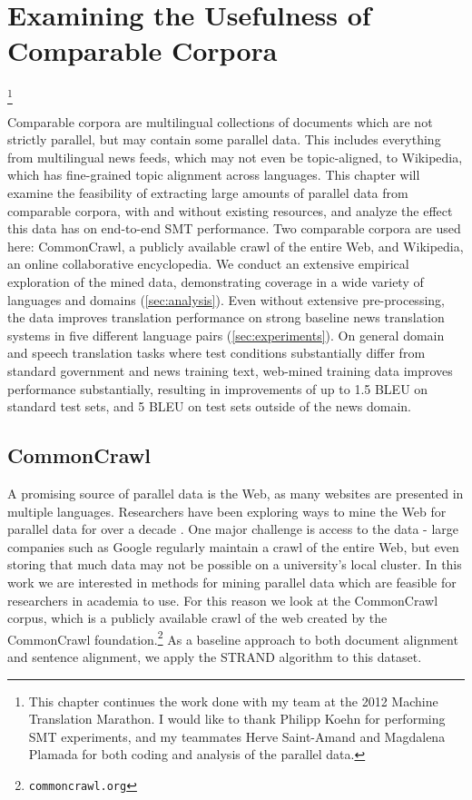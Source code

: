 \chapter{Examining the Usefulness of Comparable Corpora}\footnote{This chapter
continues the work done with my team at the 2012 Machine Translation Marathon.
I would like to thank Philipp Koehn for performing SMT experiments, and my
teammates Herve Saint-Amand and Magdalena Plamada for both coding and analysis
of the parallel data.}
\label{chap:data}

Comparable corpora are multilingual collections of documents which are not
strictly parallel, but may contain some parallel data. This includes everything
from multilingual news feeds, which may not even be topic-aligned, to Wikipedia,
which has fine-grained topic alignment across languages.
This chapter will examine the feasibility of extracting large amounts of
parallel data from comparable corpora, with and without existing resources, and
analyze the effect this data has on end-to-end SMT performance.
Two comparable corpora are used here:
CommonCrawl, a publicly available crawl of the entire Web, and Wikipedia, an
online collaborative encyclopedia.
We conduct an extensive empirical exploration of the mined data, 
demonstrating coverage in a wide variety of languages and domains (\textsection\ref{sec:analysis}). Even 
without extensive pre-processing, the data improves translation performance
on strong baseline news translation systems in five different language pairs
(\textsection\ref{sec:experiments}).
On general domain and speech translation tasks where test conditions substantially
differ from standard government and news training text, web-mined training
data improves performance substantially, resulting in improvements of up
to 1.5 BLEU on standard test sets, and 5 BLEU on test sets outside of the news
domain.

\section{CommonCrawl}
A promising source of parallel data is the Web, as many websites are presented
in multiple languages. Researchers have been exploring ways to mine the Web for
parallel data for over a decade \citep{Resnik99,Nie99,Chen00}.
One major challenge is access to 
the data - large companies such as Google regularly maintain a crawl of the
entire Web, but even storing that much data may not be possible on a
university's local cluster.
In this work we are interested in methods for mining parallel data which are
feasible for researchers in academia to use.
For this reason we look at the CommonCrawl corpus,
which is a publicly available crawl of the web created by the CommonCrawl
foundation.\footnote{{\tt commoncrawl.org}}
As a baseline approach to both document alignment and sentence alignment, we
apply the STRAND algorithm \citep{Resnik03} to this dataset.

